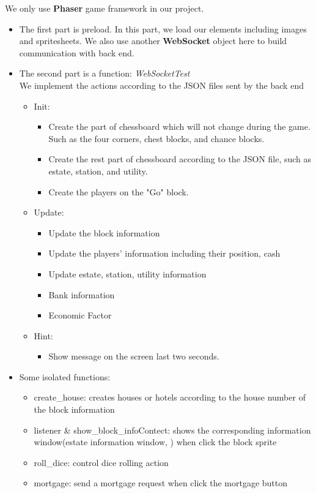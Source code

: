 \documentclass[a4paper,11pt]{article}
\begin{document}
    We only use \textbf{Phaser} game framework in our project.
    \begin{itemize}
        \item The first part is preload. In this part, we load our elements including images and spritesheets. We also use another \textbf{WebSocket} object here to build communication with back end.
        \item The second part is a function: \emph{WebSocketTest}\\
        We implement the actions according to the JSON files sent by the back end
        \begin{itemize}
            \item Init:
            \begin{itemize}
                \item Create the part of chessboard which will not change during the game. Such as the four corners, chest blocks, and chance blocks.
                \item Create the rest part of chessboard according to the JSON file, such as estate, station, and utility.
            		\item Create the players on the "Go" block.
            \end{itemize}
        \item Update:
        \begin{itemize}
            \item Update the block information
            \item Update the players' information including their position, cash 
            \item Update estate, station, utility information
            \item Bank information
            \item Economic Factor
        \end{itemize}
    \item Hint:
    \begin{itemize}
        \item Show message on the screen last two seconds.
    \end{itemize}
        \end{itemize}
        \item  Some isolated functions:
        \begin{itemize}
            \item create\_house: creates houses or hotels according to the house number of the block information
            \item listener \& show\_block\_infoContect: shows the corresponding information window(estate information window, ) when click the block sprite
            \item roll\_dice: control dice rolling action
            \item mortgage: send a mortgage request when click the mortgage button
        \end{itemize}
    \end{itemize}
\end{document}
